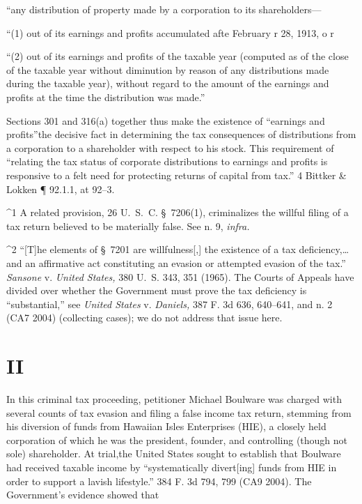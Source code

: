     ``any distribution of property made by a corporation to its
    shareholders---

      ``(1) out of its earnings and profits accumulated afte February r
    28, 1913, o                                                        r

      ``(2) out of its earnings and profits of the taxable year
    (computed as of the close of the taxable year without diminution by
    reason of any distributions made during the taxable year), without
    regard to the amount of the earnings and profits at the time the
    distribution was made.''

\noindent Sections 301 and 316(a) together thus make the existence of ``earnings
and profits''\footnotemark[3] the decisive fact in determining the tax
consequences of distributions from a corporation to a shareholder with
respect to his stock. This requirement of ``relating the tax status of
corporate distributions to earnings and profits is responsive to a felt
need for protecting returns of capital from tax.'' 4 Bittker \& Lokken
¶ 92.1.1, at 92--3.

^1 A related provision, 26 U.~S.~C. \S~7206(1), criminalizes the
willful filing of a tax return believed to be materially false. See n.
9, \emph{infra.}

^2 ``[T]he elements of \S~7201 are willfulness[,] the existence
of a tax deficiency,\dots and an affirmative act constituting an
evasion or attempted evasion of the tax.'' \emph{Sansone} v. \emph{United
States,} 380 U.~S. 343, 351 (1965). The Courts of Appeals have
divided over whether the Government must prove the tax deficiency is
``substantial,'' see \emph{United States} v. \emph{Daniels,} 387 F. 3d
636, 640--641, and n. 2 (CA7 2004) (collecting cases); we do not
address that issue here.

\section{II}

  In this criminal tax proceeding, petitioner Michael Boulware was
charged with several counts of tax evasion and \newpage  filing a false
income tax return, stemming from his diversion of funds from Hawaiian
Isles Enterprises (HIE), a closely held corporation of which he was
the president, founder, and controlling (though not sole) shareholder.
At trial,\footnotemark[4] the United States sought to establish that Boulware had
received taxable income by ``systematically divert[ing] funds from HIE
in order to support a lavish lifestyle.'' 384 F. 3d 794, 799 (CA9
2004). The Government's evidence showed that

